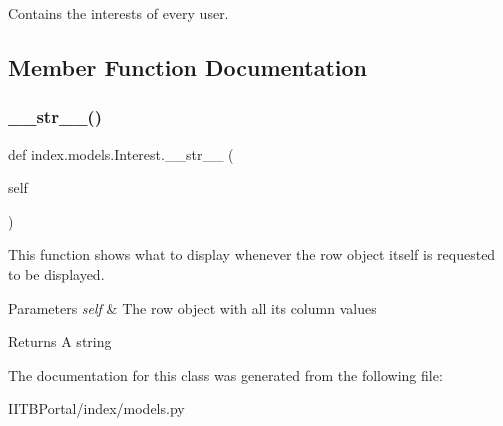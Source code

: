 Contains the interests of every user. 

\subsection{Member Function Documentation}
\mbox{\label{classindex_1_1models_1_1Interest_a3ca3a9a183c77e9975c6c69ddc5362a5}} 
\subsubsection{\texorpdfstring{\+\_\+\+\_\+str\+\_\+\+\_\+()}{\_\_str\_\_()}}
{\footnotesize\ttfamily def index.\+models.\+Interest.\+\_\+\+\_\+str\+\_\+\+\_\+ (\begin{DoxyParamCaption}\item[{}]{self }\end{DoxyParamCaption})}



This function shows what to display whenever the row object itself is requested to be displayed. 


\begin{DoxyParams}{Parameters}
{\em self} & The row object with all its column values \\
\hline
\end{DoxyParams}
\begin{DoxyReturn}{Returns}
A string 
\end{DoxyReturn}


The documentation for this class was generated from the following file\+:\begin{DoxyCompactItemize}
\item 
I\+I\+T\+B\+Portal/index/models.\+py\end{DoxyCompactItemize}

